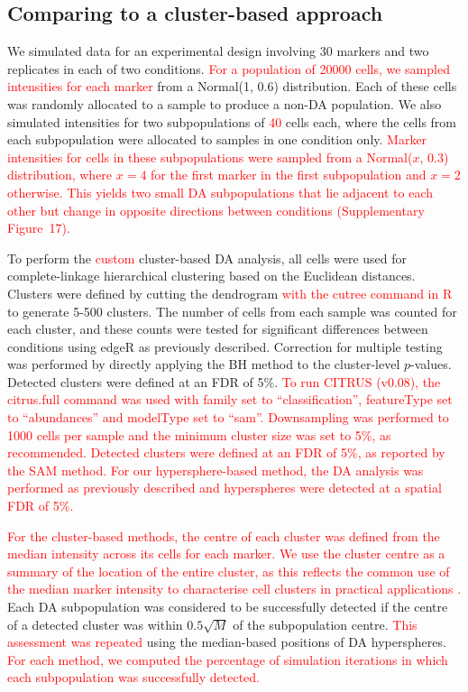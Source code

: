 \documentclass{article}
\newcommand\revised[1]{\textcolor{red}{#1}}
\newcommand{\suppfigclustersim}{17}
\begin{document}
\subsection{Comparing to a cluster-based approach}
We simulated data for an experimental design involving 30 markers and two replicates in each of two conditions.
\revised{For a population of 20000 cells, we sampled intensities for each marker} from a Normal(1, 0.6) distribution.
Each of these cells was randomly allocated to a sample to produce a non-DA population.
We also simulated intensities for two subpopulations of \revised{40} cells each, where the cells from each subpopulation were allocated to samples in one condition only.
\revised{Marker intensities for cells in these subpopulations were sampled from a Normal($x$, 0.3) distribution, where $x=4$ for the first marker in the first subpopulation and $x=2$ otherwise.
This yields two small DA subpopulations that lie adjacent to each other but change in opposite directions between conditions (Supplementary Figure~\suppfigclustersim{}).}

To perform the \revised{custom} cluster-based DA analysis, all cells were used for complete-linkage hierarchical clustering based on the Euclidean distances.
Clusters were defined by cutting the dendrogram \revised{with the cutree command in R} to generate 5-500 clusters.
The number of cells from each sample was counted for each cluster, and these counts were tested for significant differences between conditions using edgeR as previously described.
Correction for multiple testing was performed by directly applying the BH method to the cluster-level $p$-values.
Detected clusters were defined at an FDR of 5\%.
\revised{To run CITRUS (v0.08), the citrus.full command was used with family set to ``classification'', featureType set to ``abundances'' and modelType set to ``sam''.
Downsampling was performed to 1000 cells per sample and the minimum cluster size was set to 5\%, as recommended.
Detected clusters were defined at an FDR of 5\%, as reported by the SAM method.
For our hypersphere-based method, the DA analysis was performed as previously described and hyperspheres were detected at a spatial FDR of 5\%.}

\revised{For the cluster-based methods, the centre of each cluster was defined from the median intensity across its cells for each marker.
We use the cluster centre as a summary of the location of the entire cluster, as this reflects the common use of the median marker intensity to characterise cell clusters in practical applications \cite{qiu2011extracting,bruggner2014automated}.}
Each DA subpopulation was considered to be successfully detected if the centre of a detected cluster was within $0.5\sqrt{M}$ of the subpopulation centre.
\revised{This assessment was repeated} using the median-based positions of DA hyperspheres.
\revised{For each method, we computed the percentage of simulation iterations in which each subpopulation was successfully detected.}
\end{document}
